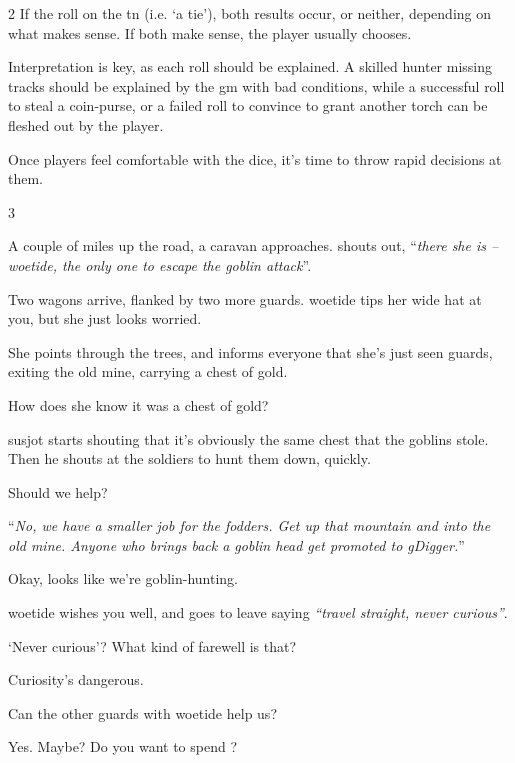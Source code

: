 \begin{multicols}{2}
\noindent
If the roll on the \gls{tn} (i.e. `a tie'), both results occur, or neither, depending on what makes sense.
If both make sense, the player usually chooses.

Interpretation is key, as each roll should be explained.
A skilled hunter missing tracks should be explained by the \gls{gm} with bad conditions, while a successful roll to steal a coin-purse, or a failed roll to convince  to grant another \gls{torch} can be fleshed out by the player.

Once players feel comfortable with the dice, it's time to throw rapid decisions at them.

\end{multicols}

\bigLine

\begin{multicols}{3}

\begin{description}\sf
  \item[\Gls{gm}:]
  A couple of miles up the road, a caravan approaches.
   shouts out, ``\textit{there she is -- \gls{woetide}, the only one to escape the goblin attack}''.

  Two wagons arrive, flanked by two more \glspl{guard}.
  \Gls{woetide} tips her wide hat at you, but she just looks worried.

  She points through the trees, and informs everyone that she's just seen \glspl{guard}, exiting the old mine, carrying a chest of gold.

  \item[Player 3:]
  How does she know it was a chest of gold?
  \item[\Gls{gm}:]
  \Gls{susjot} starts shouting that it's obviously the same chest that the goblins stole.
  Then he shouts at the \glspl{soldier} to hunt them down, quickly.
  \item[Player 1:]
  Should we help?
  \item[\Gls{gm}:]
  ``\textit{No, we have a smaller job for the \glspl{fodder}.
  Get up that mountain and into the old mine.
  Anyone who brings back a goblin head get promoted to \gls{gDigger}.}''
  \item[Player 1:]
  Okay, looks like we're goblin-hunting.
  \item[\Gls{gm}:]
  \Gls{woetide} wishes you well, and goes to leave saying \textit{``travel straight, never curious''}.
  \item[Player 2:]
  `Never curious'?
  What kind of farewell is that?
  \item[Player 1:]
  Curiosity's dangerous.
  \item[Player 2:]
  Can the other \glspl{guard} with \gls{woetide} help us?
  \item[\Gls{gm}:]
  Yes.
  Maybe?
  Do you want to spend ?
\end{description}

\end{multicols}
